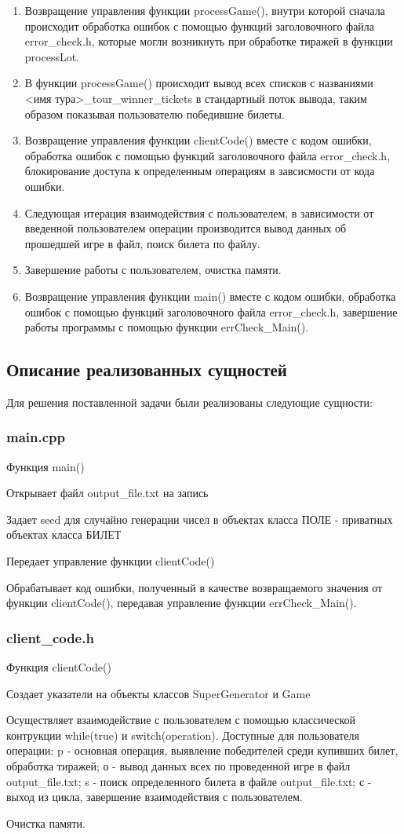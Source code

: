 \documentclass[a4paper,14pt]{article}
\begin{document}
\begin{enumerate}
  \item Возвращение управления функции processGame(), внутри которой сначала происходит обработка ошибок с помощью функций заголовочного файла error\_check.h, которые могли возникнуть при обработке тиражей в функции processLot.
  \item В функции processGame() происходит вывод всех списков с названиями  <имя тура>\_tour\_winner\_tickets в стандартный поток вывода, таким образом показывая пользователю победившие билеты.
  \item Возвращение управления функции clientCode() вместе с кодом ошибки, обработка ошибок с помощью функций заголовочного файла error\_check.h, блокирование доступа к определенным операциям в завсисмости от кода ошибки.
  \item Следующая итерация взаимодействия с пользователем, в зависимости от введенной пользователем операции производится вывод данных об прошедшей игре в файл, поиск билета по файлу.
  \item Завершение работы с пользователем, очистка памяти.
  \item Возвращение управления функции main() вместе с кодом ошибки, обработка ошибок с помощью функций заголовочного файла error\_check.h, завершение работы программы с помощью функции errCheck\_Main().
\end{enumerate}
\subsection{Описание реализованных сущностей}
Для решения поставленной задачи были реализованы следующие сущности:
\subsubsection{main.cpp}
\begin{center}
   Функция main()
\end{center}
Открывает файл output\_file.txt на запись 
\item Задает seed для случайно генерации чисел в объектах класса ПОЛЕ - приватных объектах класса БИЛЕТ
\item Передает управление функции clientCode()
\item Обрабатывает код ошибки, полученный в качестве возвращаемого значения от функции clientCode(), передавая управление функции  errCheck\_Main().
\subsubsection{client\_code.h}
\begin{center}
   Функция clientCode()
\end{center}
Создает указатели на объекты классов SuperGenerator и Game
\item Осуществляет взаимодействие с пользователем с помощью классической контрукции while(true) и switch(operation). Доступные для пользователя операции: p - основная операция, выявление победителей среди купивших билет, обработка тиражей; о - вывод данных всех по проведенной игре в файл output\_file.txt; s - поиск определенного билета в файле output\_file.txt; с - выход из цикла, завершение взаимодействия с пользователем.
\item Очистка памяти.
\end{document}
